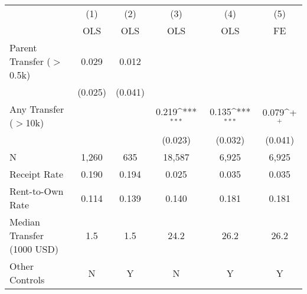 {
\def\sym#1{\ifmmode^{#1}\else\(^{#1}\)\fi}
\begin{tabular}{l*{5}{c}}
\toprule
                &\multicolumn{1}{c}{(1)}&\multicolumn{1}{c}{(2)}&\multicolumn{1}{c}{(3)}&\multicolumn{1}{c}{(4)}&\multicolumn{1}{c}{(5)}\\
                &\multicolumn{1}{c}{OLS}&\multicolumn{1}{c}{OLS}&\multicolumn{1}{c}{OLS}&\multicolumn{1}{c}{OLS}&\multicolumn{1}{c}{FE}\\
\midrule
\;Parent Transfer ($>$0.5k)&    0.029         &    0.012         &                  &                  &                  \\
                &  (0.025)         &  (0.041)         &                  &                  &                  \\
\;Any Transfer ($>$10k)&                  &                  &    0.219\sym{***}&    0.135\sym{***}&    0.079\sym{+}  \\
                &                  &                  &  (0.023)         &  (0.032)         &  (0.041)         \\
\midrule
N               &    1,260         &      635         &   18,587         &    6,925         &    6,925         \\
Receipt Rate    &    0.190         &    0.194         &    0.025         &    0.035         &    0.035         \\
Rent-to-Own Rate&    0.114         &    0.139         &    0.140         &    0.181         &    0.181         \\
Median Transfer (1000 USD)&      1.5         &      1.5         &     24.2         &     26.2         &     26.2         \\
Other Controls  &        N         &        Y         &        N         &        Y         &        Y         \\
\bottomrule
\end{tabular}
}
